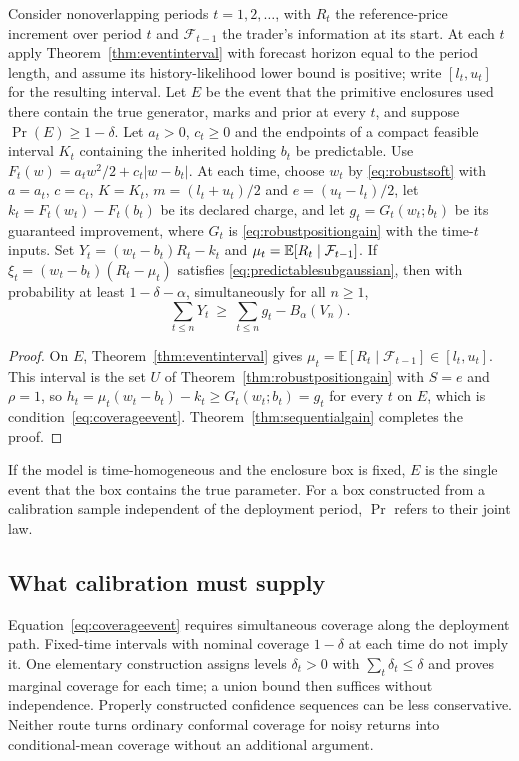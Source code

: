 \begin{corollary}\label{cor:main-chain}
Consider nonoverlapping periods $t=1,2,\dots$, with $R_t$ the reference-price
increment over period $t$ and $\mathcal F_{t-1}$ the trader's information at its
start. At each $t$ apply Theorem~\ref{thm:eventinterval} with forecast
horizon equal to the period length, and assume its history-likelihood lower
bound is positive; write $[l_t,u_t]$ for the resulting interval. Let $E$ be the
event that the primitive enclosures used there contain the true generator,
marks and prior at every $t$, and suppose $\Pr(E)\ge1-\delta$. Let $a_t>0$, $c_t\ge0$ and the endpoints of a compact feasible interval
$K_t$ containing the inherited holding $b_t$ be predictable. Use
$F_t(w)=a_tw^2/2+c_t|w-b_t|$. At each time, choose $w_t$ by \eqref{eq:robustsoft} with $a=a_t$, $c=c_t$, $K=K_t$, $m=(l_t+u_t)/2$ and $e=(u_t-l_t)/2$,
let $k_t=F_t(w_t)-F_t(b_t)$ be its declared charge, and let
$g_t=G_t(w_t;b_t)$ be its guaranteed improvement, where $G_t$ is
\eqref{eq:robustpositiongain} with the time-$t$ inputs. Set $Y_t=(w_t-b_t)R_t-k_t$ and $\mu_t=\mathbb E[R_t\mid\mathcal F_{t-1}]$. If
$\xi_t=(w_t-b_t)(R_t-\mu_t)$ satisfies \eqref{eq:predictablesubgaussian}, then with probability at least
$1-\delta-\alpha$, simultaneously for all $n\ge1$,
\[
  \sum_{t\le n}Y_t\ \ge\ \sum_{t\le n}g_t-B_\alpha(V_n).
\]
\end{corollary}

\begin{proof}
On $E$, Theorem~\ref{thm:eventinterval} gives
$\mu_t=\mathbb E[R_t\mid\mathcal F_{t-1}]\in[l_t,u_t]$. This interval is the set
$U$ of Theorem~\ref{thm:robustpositiongain} with $S=e$ and $\rho=1$, so
$h_t=\mu_t(w_t-b_t)-k_t\ge G_t(w_t;b_t)=g_t$ for every $t$ on $E$, which is
condition~\eqref{eq:coverageevent}. Theorem~\ref{thm:sequentialgain} completes the proof.
\end{proof}
If the model is time-homogeneous and the enclosure box is fixed, $E$ is the
single event that the box contains the true parameter. For a box constructed
from a calibration sample independent of the deployment period,
$\Pr$ refers to their joint law.

\subsection{What calibration must supply}

Equation~\eqref{eq:coverageevent} requires simultaneous coverage along the
deployment path. Fixed-time intervals with nominal coverage $1-\delta$ at
each time do not imply it. One elementary construction assigns levels
$\delta_t>0$ with $\sum_t\delta_t\le\delta$ and proves marginal coverage
for each time; a union bound then suffices without independence. Properly
constructed confidence sequences can be less conservative. Neither route
turns ordinary conformal coverage for noisy returns into conditional-mean
coverage without an additional argument.

